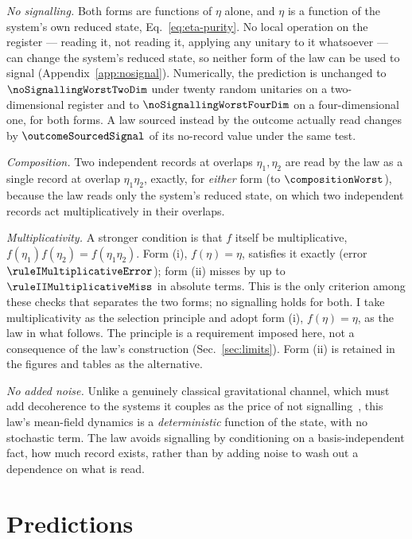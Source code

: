 \documentclass[aps,pra,reprint,amsmath,amssymb,superscriptaddress]{revtex4-2}
\begin{document}
\emph{No signalling.} Both forms are functions of $\eta$ alone, and $\eta$ is
a function of the system's own reduced state, Eq.~\eqref{eq:eta-purity}.
No local operation on the register --- reading it, not reading it, applying
any unitary to it whatsoever --- can change the system's reduced state, so
neither form of the law can be used to signal
(Appendix~\ref{app:nosignal}). Numerically, the prediction is unchanged to
$\noSignallingWorstTwoDim$ under twenty random unitaries on a two-dimensional
register and to $\noSignallingWorstFourDim$ on a four-dimensional one, for
both forms. A law sourced instead by the outcome actually read changes by
$\outcomeSourcedSignal$ of its no-record value under the same test.

\emph{Composition.} Two independent records at overlaps $\eta_1,\eta_2$ are
read by the law as a single record at overlap $\eta_1\eta_2$, exactly, for
\emph{either} form (to $\compositionWorst$), because the law reads only the
system's reduced state, on which two independent records act multiplicatively
in their overlaps. %

\emph{Multiplicativity.} A stronger condition is that $f$ itself be
multiplicative, $f(\eta_1)f(\eta_2)=f(\eta_1\eta_2)$. Form (i), $f(\eta)=\eta$,
satisfies it exactly (error $\ruleIMultiplicativeError$); form (ii) misses by
up to $\ruleIIMultiplicativeMiss$ in absolute terms. This is the only
criterion among these checks that separates the two forms; no signalling holds
for both. %
I take multiplicativity as the selection principle and adopt form (i),
$f(\eta)=\eta$, as the law in what follows. The principle is a requirement
imposed here, not a consequence of the law's construction (Sec.~\ref{sec:limits}).
Form (ii) is retained in the figures and tables as the alternative.

\emph{No added noise.} Unlike a genuinely classical gravitational channel,
which must add decoherence to the systems it couples as the price of not
signalling~\cite{Kafri2014}, this law's mean-field dynamics is a
\emph{deterministic} function of the state, with no stochastic term. The law
avoids signalling by conditioning on a basis-independent fact, how much record
exists, rather than by adding noise to wash out a dependence on what is read.

\section{Predictions}
\label{sec:predictions}
\end{document}
